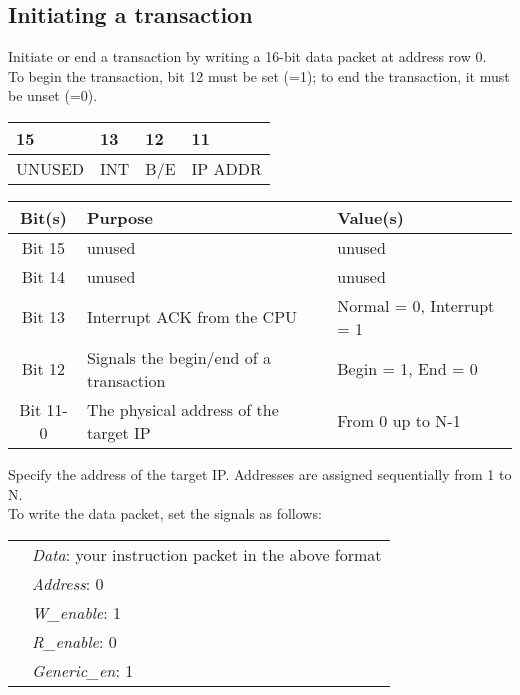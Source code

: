 \subsection{Initiating a transaction} \label{3.1}
Initiate or end a transaction by writing a 16-bit data packet at address row 0.\\To begin the transaction, bit 12 must be set (=1); to end the transaction, it must be unset (=0).
	\begin{center}
		\begin{tabular}{ | l | l |  l | l | }
			
			15  \qquad  \qquad 14 & 13 & 12 & 11 \qquad \qquad 0 \\ \hline
			UNUSED & INT & B/E & IP ADDR\\ \hline
			
			
			\hline
		\end{tabular}
	\end{center}
\begin{center}
	\begin{tabular}{ | c | p{7 cm} |  l |}
		\hline
		Bit(s) & Purpose & Value(s)  \\ \hline
		Bit 15 & unused  & unused 
		\\ \hline
		Bit 14 & unused  & unused\\
		\hline
		Bit 13 & Interrupt ACK from the CPU   & Normal = 0, Interrupt  =  1
		\\ \hline
		
		Bit 12 & Signals the begin/end of a transaction & Begin  = 1, End = 0 
		\\ \hline
		
		
		
		Bit 11-0 & The physical address of the target IP &
		From 0 up to N-1  \\
		
		
		
		\hline
	\end{tabular}
\end{center}
\vspace{0.5cm}
Specify the address of the target IP. Addresses are assigned sequentially from 1 to N.
\vspace{0.5cm}\\
To write the data packet, set the signals as follows:\vspace{0.5cm}\\
	\begin{tabular}{ p{0.7cm} p{14 cm} }
		&\textit{Data}: your instruction packet in the above format\\
&\textit{Address}: 0\\
&\textit{W\_enable}: 1\\
&\textit{R\_enable}: 0 \\
&\textit{Generic\_en}: 1
\end{tabular}\vspace{0.5cm}\\
